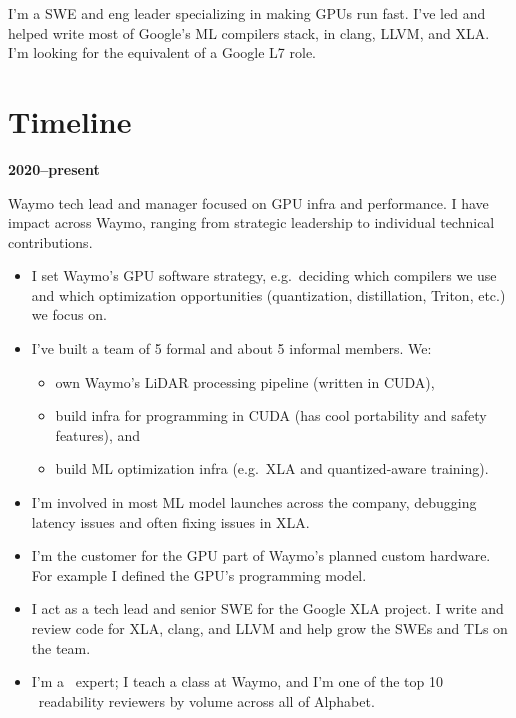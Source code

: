 \documentclass[12pt]{article}
\makeatletter
\DeclareRobustCommand{\Cpp}
{\valign{\vfil\hbox{##}\vfil\cr
   {C\kern-.05em}\cr
   $\hbox{\fontsize{\sf@size}{0}\textbf{+\kern-0.05em+}}$\cr}%
}
\makeatother
\begin{document}
\begin{minipage}{0.65\textwidth}
I'm a SWE and eng leader specializing in making GPUs run fast.  I've led and
helped write most of Google's ML compilers stack, in clang, LLVM, and XLA.
I'm looking for the equivalent of a Google L7 role.
\end{minipage}
%
\hfill\begin{minipage}{0.30\textwidth}
\vspace{-1.40em}
\raggedleft
{}
\end{minipage}

\section*{Timeline}

\begin{minipage}{7em} \textbf{2020--present} \end{minipage} Waymo tech lead and
  manager focused on GPU infra and performance.  I have impact across Waymo,
  ranging from strategic leadership to individual technical contributions.

\begin{itemize}[topsep=0em, itemsep=0pt, parsep=0.25em]
\item I set Waymo's GPU software strategy, e.g.\ deciding which compilers we use
  and which optimization opportunities (quantization, distillation, Triton,
  etc.) we focus on.
\item I've built a team of 5 formal and about 5 informal members.  We:
  \begin{itemize}[topsep=0em, itemsep=0pt, parsep=0em]
    \item own Waymo's LiDAR processing pipeline (written in CUDA),
    \item build infra for programming in CUDA (has cool portability and safety features), and
    \item build ML optimization infra (e.g.\ XLA and quantized-aware training).
  \end{itemize}
\item I'm involved in most ML model launches across the company, debugging
  latency issues and often fixing issues in XLA.
\item I'm the customer for the GPU part of Waymo's planned custom hardware.
  For example I defined the GPU's programming model.
\item I act as a tech lead and senior SWE for the Google XLA project.  I write
  and review code for XLA, clang, and LLVM and help grow the SWEs and TLs on
  the team.
\item I'm a \Cpp\ expert; I teach a class at Waymo, and I'm one of the top 10
  \Cpp\ readability reviewers by volume across all of Alphabet.
\end{itemize}
\end{document}
